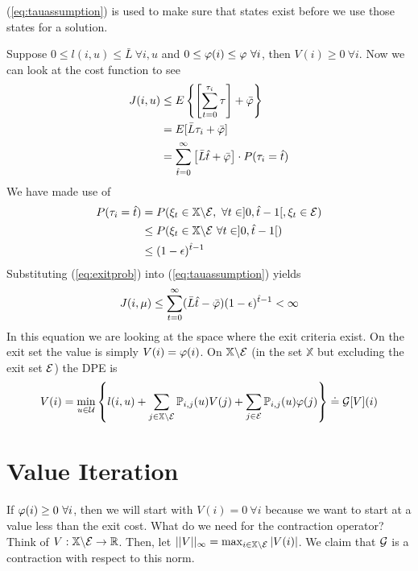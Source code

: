 (\ref{eq:tauassumption}) is used to make sure that states exist before we use those states for a solution.

Suppose $0\leq l(i,u)\leq \bar{L} ~\forall i,u$ and $0\leq \varphi(i) \leq \varphi ~\forall i$, then $V(i)\geq0 ~\forall i$. Now we can look at the cost function to see
\begin{align}
\label{eq:exitcost}
J(i,u) &\leq E\left\lbrace \left[\sum_{t=0}^{\tau_i}\tau\right] + \bar{\varphi}\right\rbrace \nonumber \\
&= E[\bar{L}\tau_i+\bar{\varphi}] \nonumber \\
&= \sum_{\hat{t}=0}^\infty\left[\bar{L}\hat{t}+\bar{\varphi}\right]\cdot P(\tau_i=\hat{t})
\end{align}
We have made use of
\begin{align}
\label{eq:exitprob}
P(\tau_i=\hat{t}) &= P(\xi_t\in\mathbb{X}\backslash\mathcal{E}, ~\forall t\in]0,\hat{t}-1[, \xi_t\in\mathcal{E}) \nonumber \\
&\leq P(\xi_t\in\mathbb{X}\backslash\mathcal{E} ~\forall t\in]0,\hat{t}-1[) \nonumber \\
&\leq (1-\epsilon)^{\hat{t}-1}
\end{align}
Substituting (\ref{eq:exitprob}) into (\ref{eq:tauassumption}) yields
$$J(i,\mu) \leq \sum_{t=0}^\infty (\bar{L}\hat{t}-\bar{\varphi})(1-\epsilon)^{\hat{t}-1}<\infty$$
In this equation we are looking at the space where the exit criteria exist. On the exit set the value is simply $V(i)=\varphi(i)$. On $\mathbb{X}\backslash\mathcal{E}$ (in the set $\mathbb{X}$ but excluding the exit set $\mathcal{E}$) the DPE is
$$V(i) = \min_{u\in\mathcal{U}}\left\lbrace l(i,u) + \sum_{j\in\mathbb{X}\backslash\mathcal{E}}\mathbb{P}_{i,j}(u)V(j) + \sum_{j\in\mathcal{E}}\mathbb{P}_{i,j}(u)\varphi(j)\right\rbrace \doteq \mathcal{G}[V](i)$$

\section{Value Iteration}
If $\varphi(i)\geq0 ~\forall i$, then we will start with $V(i)=0 ~\forall i$ because we want to start at a value less than the exit cost. What do we need for the contraction operator? Think of $V:\mathbb{X}\backslash\mathcal{E}\to\mathbb{R}$. Then, let $||V||_\infty = \max_{i\in\mathbb{X}\backslash\mathcal{E}}|V(i)|$. We claim that $\mathcal{G}$ is a contraction with respect to this norm.

